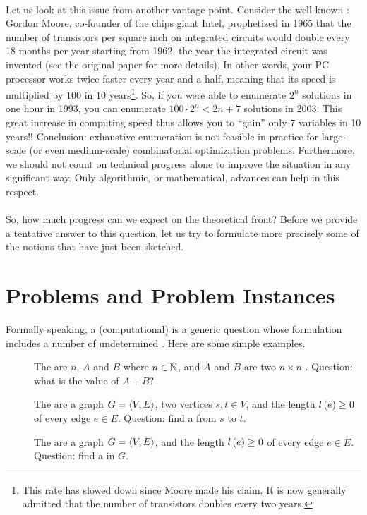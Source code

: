 \paragraph{}
Let us look at this issue from another vantage point. Consider the well-known : Gordon Moore, co-founder of the chips giant Intel, prophetized in 1965 that the number of transistors per square inch on integrated circuits would double every 18 months per year starting from 1962, the year the integrated circuit was invented (see the original paper for more details). In other words, your PC processor works twice faster every year and a half, meaning that its speed is multiplied by $100$ in $10$ years\footnote{This rate has slowed down since Moore made his claim. It is now generally admitted that the number of transistors doubles every two years.}. So, if you were able to enumerate $2^n$ solutions in one hour in 1993, you can enumerate $100\cdot2^n<2{n+7}$ solutions in 2003. This great increase in computing speed thus allows you to ``gain'' only $7$ variables in 10 years!! Conclusion: exhaustive enumeration is not feasible in practice for large-scale (or even medium-scale) combinatorial optimization problems. Furthermore, we should not count on technical progress alone to improve the situation in any significant way. Only algorithmic, or mathematical, advances can help in this respect.

\paragraph{}
So, how much progress can we expect on the theoretical front? Before we provide a tentative answer to this question, let us try to formulate more precisely some of the notions that have just been sketched.

\section{Problems and Problem Instances}
Formally speaking, a (computational)  is a generic question whose formulation includes a number of undetermined . Here are some simple examples.

\begin{description}
 \item[] The  are $n$, $A$ and $B$ where $n\in\mathbb{N}$, and $A$ and $B$ are two $n\times n$ . Question: what is the value of $A+B$?
 \item[] The  are a graph $G=\left\langle V,E \right\rangle$, two vertices $s,t\in V$, and the length $l\left( e \right)\geq 0$ of every edge $e\in E$. Question: find a  from $s$ to $t$.
 \item[] The  are a graph $G=\left\langle V,E \right\rangle$, and the length $l\left( e \right)\geq 0$ of every edge $e\in E$. Question: find a  in $G$.
\end{description}

